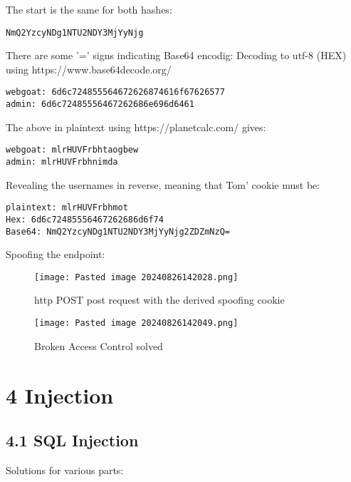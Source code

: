 \documentclass[
	letterpaper, %
	10pt, %
	unnumberedsections, %
	twoside, %
]{APAAssignment}
\begin{document}
\begin{appendices}
The start is the same for both hashes:

\begin{verbatim}
NmQ2YzcyNDg1NTU2NDY3MjYyNjg
\end{verbatim}


There are some '=' signs indicating Base64 encodig:
Decoding to utf-8 (HEX) using https://www.base64decode.org/

\begin{verbatim}
webgoat: 6d6c724855564672626874616f67626577
admin: 6d6c72485556467262686e696d6461
\end{verbatim}


The above in plaintext using https://planetcalc.com/ gives:

\begin{verbatim}
webgoat: mlrHUVFrbhtaogbew
admin: mlrHUVFrbhnimda
\end{verbatim}

Revealing the usernames in reverse, meaning that Tom' cookie must be:

\begin{verbatim}
plaintext: mlrHUVFrbhmot
Hex: 6d6c72485556467262686d6f74
Base64: NmQ2YzcyNDg1NTU2NDY3MjYyNjg2ZDZmNzQ=
\end{verbatim}

Spoofing the endpoint: 

\begin{figure}[!h] %
	\centering
	\texttt{[image: Pasted image 20240826142028.png]}
	\caption{http POST post request with the derived spoofing cookie}
	\label{fig:SpoofPost}
\end{figure}

\begin{figure}[!h] %
	\centering
	\texttt{[image: Pasted image 20240826142049.png]}
	\caption{Broken Access Control solved}
	\label{fig:BrokenAccessControlSolvedCheck}
\end{figure}

\clearpage

\section{4 Injection}
\subsection{4.1 SQL Injection}
Solutions for various parts:


\end{appendices}
\end{document}
